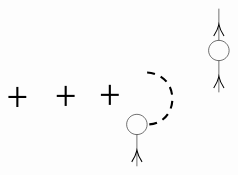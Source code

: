 \begin{equation}
\begin{tikzpicture}[x=0.75pt,y=0.75pt,yscale=-1,xscale=1]
\draw   (257.75,119.08) .. controls (257.75,113.74) and (262.12,109.4) .. (267.5,109.4) .. controls (272.88,109.4) and (277.25,113.74) .. (277.25,119.08) .. controls (277.25,124.43) and (272.88,128.77) .. (267.5,128.77) .. controls (262.12,128.77) and (257.75,124.43) .. (257.75,119.08) -- cycle ;
\draw    (267.5,159.08) -- (267.5,128.77) ;
\draw [shift={(267.5,143.93)}, rotate = 450] [color={rgb, 255:red, 0; green, 0; blue, 0 }  ][line width=0.75]    (10.93,-4.9) .. controls (6.95,-2.3) and (3.31,-0.67) .. (0,0) .. controls (3.31,0.67) and (6.95,2.3) .. (10.93,4.9)   ;
\draw [line width=1.5]    (145.25,92.8) -- (162.25,92.8) ;
\draw [line width=1.5]    (153.75,102.4) -- (153.75,83.21) ;

\draw [line width=1.5]    (191.25,91.8) -- (208.25,91.8) ;
\draw [line width=1.5]    (199.75,101.4) -- (199.75,82.21) ;

\draw [line width=1.5]    (233.25,90.8) -- (250.25,90.8) ;
\draw [line width=1.5]    (241.75,100.4) -- (241.75,81.21) ;

\draw [line width=1.5]  [dash pattern={on 5.63pt off 4.5pt}]  (277.25,69.4) .. controls (310.25,71.4) and (308.25,119.4) .. (277.25,119.08) ;
\draw    (345.5,38.72) -- (345.5,8.4) ;
\draw [shift={(345.5,23.56)}, rotate = 450] [color={rgb, 255:red, 0; green, 0; blue, 0 }  ][line width=0.75]    (10.93,-4.9) .. controls (6.95,-2.3) and (3.31,-0.67) .. (0,0) .. controls (3.31,0.67) and (6.95,2.3) .. (10.93,4.9)   ;
\draw   (335.75,48.4) .. controls (335.75,43.05) and (340.12,38.72) .. (345.5,38.72) .. controls (350.88,38.72) and (355.25,43.05) .. (355.25,48.4) .. controls (355.25,53.75) and (350.88,58.08) .. (345.5,58.08) .. controls (340.12,58.08) and (335.75,53.75) .. (335.75,48.4) -- cycle ;
\draw    (345.5,88.4) -- (345.5,58.08) ;
\draw [shift={(345.5,73.24)}, rotate = 450] [color={rgb, 255:red, 0; green, 0; blue, 0 }  ][line width=0.75]    (10.93,-4.9) .. controls (6.95,-2.3) and (3.31,-0.67) .. (0,0) .. controls (3.31,0.67) and (6.95,2.3) .. (10.93,4.9)   ;


\end{tikzpicture}
\end{equation}
